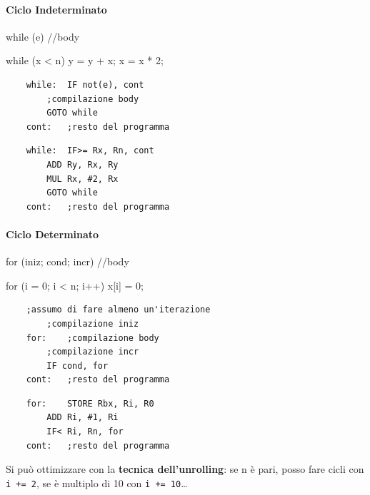 \documentclass[10pt]{report}
\begin{document}
\paragraph{Ciclo Indeterminato}
\begin{multicols}{2}
\begin{center}
	\begin{C}
	while (e) {
		//body
	}
	\end{C}
	\begin{C}
	while (x < n) {
		y = y + x;
		x = x * 2;
	}
	\end{C}
\end{center}
\columnbreak
\begin{center}
	\begin{lstlisting}
	while:	IF not(e), cont
		;compilazione body
		GOTO while
	cont:	;resto del programma
	\end{lstlisting}
	\begin{lstlisting}
	while:	IF>= Rx, Rn, cont
		ADD Ry, Rx, Ry
		MUL Rx, #2, Rx
		GOTO while
	cont:	;resto del programma
	\end{lstlisting}
\end{center}
\end{multicols}
\paragraph{Ciclo Determinato}
\begin{multicols}{2}
\begin{center}
	\begin{C}
	for (iniz; cond; incr) {
		//body
	}
	\end{C}
	\begin{C}
	for (i = 0; i < n; i++) {
		x[i] = 0;
	}
	\end{C}
\end{center}
\columnbreak
\begin{center}
	\begin{lstlisting}
	;assumo di fare almeno un'iterazione
		;compilazione iniz
	for:	;compilazione body
		;compilazione incr
		IF cond, for
	cont:	;resto del programma
	\end{lstlisting}
	\begin{lstlisting}
	for:	STORE Rbx, Ri, R0
		ADD Ri, #1, Ri
		IF< Ri, Rn, for
	cont:	;resto del programma
	\end{lstlisting}
	Si può ottimizzare con la \textbf{tecnica dell'unrolling}: se n è pari, posso fare cicli con \texttt{i += 2}, se è multiplo di 10 con \texttt{i += 10}\ldots
\end{center}
\end{multicols}
\end{document}
